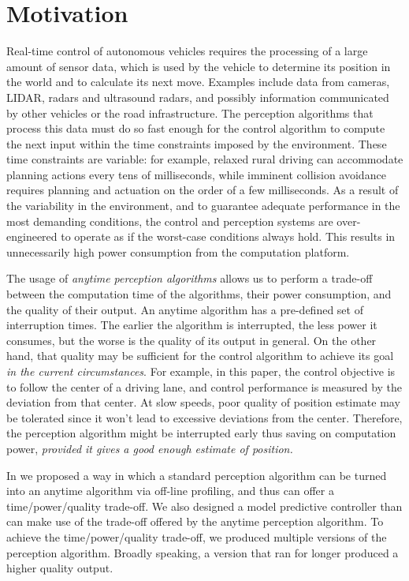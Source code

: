 \section{Motivation}
\label{sec:motivation}

Real-time control of autonomous vehicles requires the processing of a large amount of sensor data, which is used by the vehicle to determine its position in the world and to calculate its next move.
Examples include data from cameras, LIDAR, radars and ultrasound radars, and possibly information communicated by other vehicles or the road infrastructure.
The perception algorithms that process this data must do so fast enough for the control algorithm to compute the next input within the time constraints imposed by the environment.
These time constraints are variable: for example, relaxed rural driving can accommodate planning actions every tens of milliseconds, while imminent collision avoidance requires planning and actuation on the order of a few milliseconds.
As a result of the variability in the environment, and to guarantee adequate performance in the most demanding conditions, the control and perception systems are over-engineered to operate as if the worst-case conditions always hold. 
This results in unnecessarily high power consumption from the computation platform.

The usage of \emph{anytime perception algorithms} allows us to perform a trade-off between the computation time of the algorithms, their power consumption, and the quality of their output.
An anytime algorithm has a pre-defined set of interruption times. 
The earlier the algorithm is interrupted, the less power it consumes, but the worse is the quality of its output in general. 
On the other hand, that quality may be sufficient for the control algorithm to achieve its goal \emph{in the current circumstances}.
For example, in this paper, the control objective is to follow the center of a driving lane, and control performance is measured by the deviation from that center.
At slow speeds, poor quality of position estimate may be tolerated since it won't lead to excessive deviations from the center.
Therefore, the perception algorithm might be interrupted early thus saving on computation power, \emph{provided it gives a good enough estimate of position. }

In \cite{RTSS15} we proposed a way in which a standard perception algorithm can be turned into an anytime algorithm via off-line profiling, and thus can offer a time/power/quality trade-off.
We also designed a model predictive controller than can make use of the trade-off offered by the anytime perception algorithm.
To achieve the time/power/quality trade-off, we produced multiple versions of the perception algorithm.
Broadly speaking, a version that ran for longer produced a higher quality output. 


